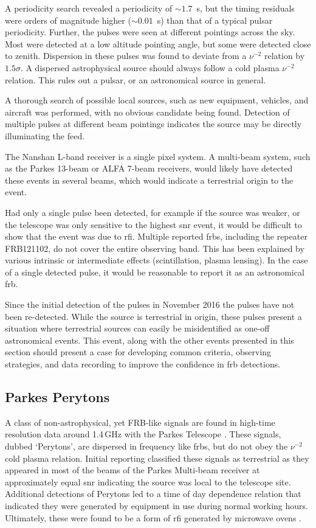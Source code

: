 \documentclass[a4paper,fleqn,usenatbib]{mnras}
\begin{document}
A periodicity search revealed a periodicity of $\sim 1.7$~s, but the timing
residuals were orders of magnitude higher \mbox{($\sim 0.01$~s)} than that of a
typical pulsar periodicity. Further, the pulses were seen at different pointings
across the sky.  Most were detected at a low altitude pointing angle, but some
were detected close to zenith.  Dispersion in these pulses was found to deviate
from a $\nu^{-2}$ relation by $1.5 \sigma$. A dispersed astrophysical source
should always follow a cold plasma $\nu^{-2}$ relation.  This rules out a
pulsar, or an astronomical source in general.

A thorough search of possible local sources, such as new equipment, vehicles,
and aircraft was performed, with no obvious candidate being found. Detection of
multiple pulses at different beam pointings indicates the source may be directly
illuminating the feed.

The Nanshan L-band receiver is a single pixel system. A multi-beam system, such
as the Parkes 13-beam or ALFA 7-beam receivers, would likely have detected these
events in several beams, which would indicate a terrestrial origin to the event.

Had only a single pulse been detected, for example if the source was weaker, or
the telescope was only sensitive to the highest \gls{snr} event, it would be
difficult to show that the event was due to \gls{rfi}.  Multiple reported
\glspl{frb}, including the repeater FRB121102, do not cover the entire observing
band. This has been explained by various intrinsic or intermediate effects
(scintillation, plasma lensing). In the case of a single detected pulse, it would
be reasonable to report it as an astronomical \gls{frb}.

Since the initial detection of the pulses in November 2016 the pulses have not
been re-detected. While the source is terrestrial in origin, these pulses
present a situation where terrestrial sources can easily be misidentified as
one-off astronomical events. This event, along with the other events presented
in this section should present a case for developing common criteria, observing
strategies, and data recording to improve the confidence in \gls{frb}
detections.

\subsection{Parkes Perytons}
\label{sec:perytons}

A class of non-astrophysical, yet FRB-like signals are found in high-time
resolution data around 1.4\,GHz with the Parkes Telescope
\citep{2011ApJ...727...18B}. These signals, dubbed `Perytons', are dispersed in
frequency like \glspl{frb}, but do not obey the $\nu^{-2}$ cold plasma relation.
Initial reporting classified these signals as terrestrial as they appeared in
most of the beams of the Parkes Multi-beam receiver at approximately equal
\gls{snr} indicating the source was local to the telescope site. Additional
detections of Perytons led to a time of day dependence relation that indicated
they were generated by equipment in use during normal working hours.
Ultimately, these were found to be a form of \gls{rfi} generated by microwave
ovens \citep{2015MNRAS.451.3933P}.
\end{document}
